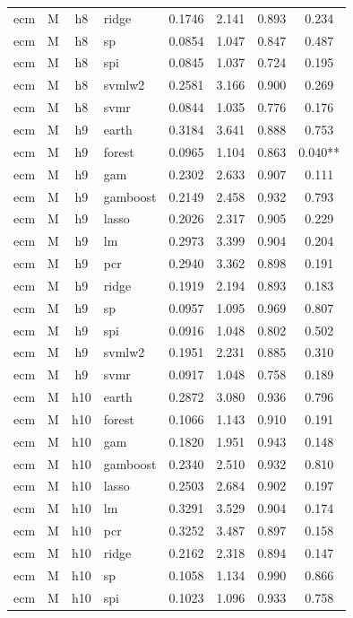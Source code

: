 \begin{ThreePartTable}
\begin{longtable}[t]{llclcccc}
ecm & M & h8 & ridge & 0.1746 & 2.141 & 0.893 & 0.234\\
ecm & M & h8 & sp & 0.0854 & 1.047 & 0.847 & 0.487\\
ecm & M & h8 & spi & 0.0845 & 1.037 & 0.724 & 0.195\\
ecm & M & h8 & svmlw2 & 0.2581 & 3.166 & 0.900 & 0.269\\
ecm & M & h8 & svmr & 0.0844 & 1.035 & 0.776 & 0.176\\
\addlinespace
ecm & M & h9 & earth & 0.3184 & 3.641 & 0.888 & 0.753\\
ecm & M & h9 & forest & 0.0965 & 1.104 & 0.863 & 0.040**\\
ecm & M & h9 & gam & 0.2302 & 2.633 & 0.907 & 0.111\\
ecm & M & h9 & gamboost & 0.2149 & 2.458 & 0.932 & 0.793\\
ecm & M & h9 & lasso & 0.2026 & 2.317 & 0.905 & 0.229\\
ecm & M & h9 & lm & 0.2973 & 3.399 & 0.904 & 0.204\\
ecm & M & h9 & pcr & 0.2940 & 3.362 & 0.898 & 0.191\\
ecm & M & h9 & ridge & 0.1919 & 2.194 & 0.893 & 0.183\\
ecm & M & h9 & sp & 0.0957 & 1.095 & 0.969 & 0.807\\
ecm & M & h9 & spi & 0.0916 & 1.048 & 0.802 & 0.502\\
ecm & M & h9 & svmlw2 & 0.1951 & 2.231 & 0.885 & 0.310\\
ecm & M & h9 & svmr & 0.0917 & 1.048 & 0.758 & 0.189\\
\addlinespace
ecm & M & h10 & earth & 0.2872 & 3.080 & 0.936 & 0.796\\
ecm & M & h10 & forest & 0.1066 & 1.143 & 0.910 & 0.191\\
ecm & M & h10 & gam & 0.1820 & 1.951 & 0.943 & 0.148\\
ecm & M & h10 & gamboost & 0.2340 & 2.510 & 0.932 & 0.810\\
ecm & M & h10 & lasso & 0.2503 & 2.684 & 0.902 & 0.197\\
ecm & M & h10 & lm & 0.3291 & 3.529 & 0.904 & 0.174\\
ecm & M & h10 & pcr & 0.3252 & 3.487 & 0.897 & 0.158\\
ecm & M & h10 & ridge & 0.2162 & 2.318 & 0.894 & 0.147\\
ecm & M & h10 & sp & 0.1058 & 1.134 & 0.990 & 0.866\\
ecm & M & h10 & spi & 0.1023 & 1.096 & 0.933 & 0.758\\

\end{longtable}
\end{ThreePartTable}
